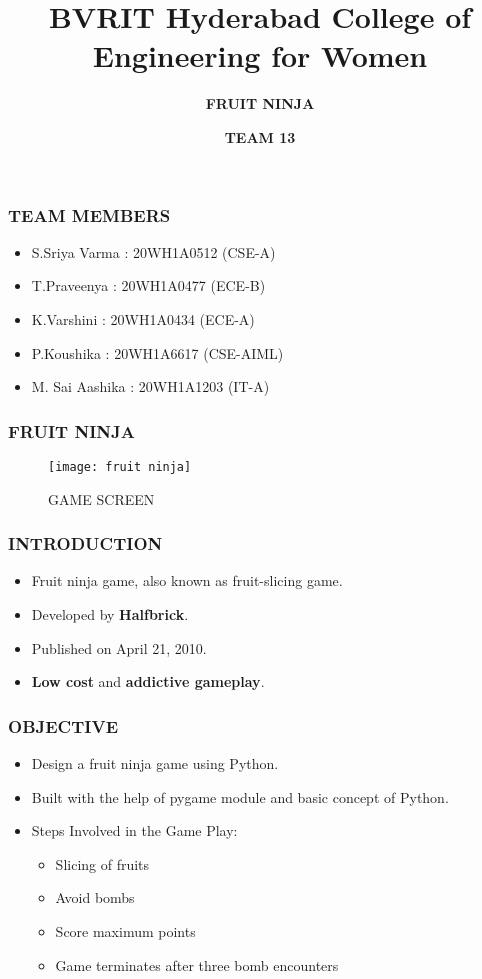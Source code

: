 \documentclass{beamer}
\title{\bfseries BVRIT Hyderabad College of Engineering for Women}
\subtitle{\bfseries FRUIT NINJA}
\author{\bfseries TEAM 13}
\begin{document}
 \begin{frame}
 \titlepage
  \end{frame}
  
  
 \begin{frame}
 \frametitle {\bfseries TEAM MEMBERS}
 \begin{itemize}
 \item S.Sriya Varma : 20WH1A0512 (CSE-A) 
 \item T.Praveenya : 20WH1A0477 (ECE-B)
 \item K.Varshini : 20WH1A0434 (ECE-A)
 \item P.Koushika : 20WH1A6617 (CSE-AIML)
 \item M. Sai Aashika : 20WH1A1203 (IT-A)
 \end{itemize}
 \end{frame} 
 
 \begin{frame}
\Huge
\frametitle{\bfseries FRUIT NINJA}
\bigskip
\begin{figure}
 \texttt{[image: fruit ninja]}
 \caption{GAME SCREEN}
\end{figure}
\end{frame}

\begin{frame}
\frametitle{\bfseries INTRODUCTION}
\bigskip

\begin{itemize}
 \item Fruit ninja game, also known as fruit-slicing game.
 \item Developed by {\bfseries Halfbrick}.
 \item Published on April 21, 2010.
 \item {\bfseries Low cost} and {\bfseries addictive gameplay}.

\end{itemize}
\end{frame}

\begin{frame}
\frametitle{\bfseries OBJECTIVE}
\bigskip
\begin{itemize} 
  \item Design a fruit ninja game using Python.\\ 
  \item Built with the help of pygame module and basic concept of Python.\\
  \item Steps Involved in the Game Play:
  
  \large 
   \begin{itemize}
   \item Slicing of fruits
   \item Avoid bombs
   \item Score maximum points
   \item Game terminates after three bomb encounters
   \end{itemize}
\end{itemize}
    
\end{frame}  
\end{document}
